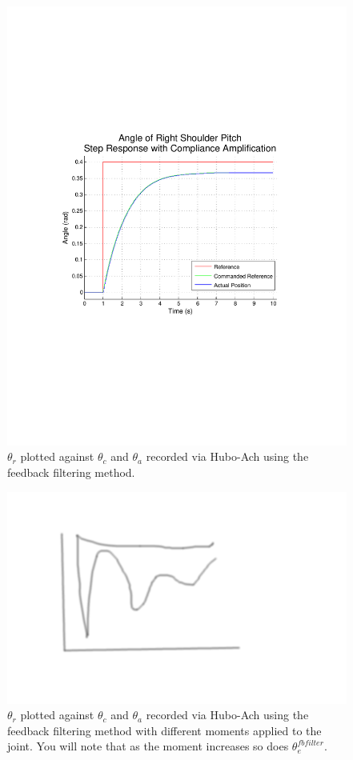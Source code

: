 \begin{figure}[thpb]
  \centering
\includegraphics[width=0.8\columnwidth]{./examples/pix/RSP-Zp4-step-enc-real-crop.pdf}
  \caption{$\theta_r$ plotted against $\theta_c$ and $\theta_a$ recorded via Hubo-Ach using the feedback filtering method.}
  \label{fig:singleJointStepFilteredFeedback}
\end{figure}

\begin{figure}[thpb]
  \centering
\includegraphics[width=0.8\columnwidth]{./pix/tmp.png}
  \caption{$\theta_r$ plotted against $\theta_c$ and $\theta_a$ recorded via Hubo-Ach using the feedback filtering method with different moments applied to the joint.  You will note that as the moment increases so does $\theta_e^{fbfilter}$. }
  \label{fig:singleJointStepFilteredFeedbackMoment}
\end{figure}
